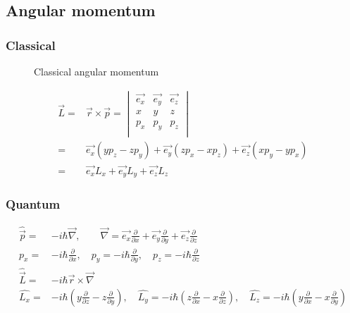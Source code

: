 	\subsection{Angular momentum}
		\label{sec:angmomentum}
		\subsubsection{Classical}
			\begin{figure}[!h]
				\centering
				
				\caption{Classical angular momentum}
				\label{clasmoment}
			\end{figure}
			
			\begin{align}
				\vec{L} =& \vec{r}\times\vec{p} =
				\begin{vmatrix}
					\vec{e_x} & \vec{e_y} & \vec{e_z} \\
					x & y & z \\
					p_x & p_y & p_z \\
				\end{vmatrix} \\
				=& \vec{e_x}(yp_z - zp_y) + \vec{e_y}(zp_x - xp_z) + \vec{e_z}(xp_y - yp_x) \\
				=& \vec{e_x}L_x + \vec{e_y}L_y + \vec{e_z}L_z
			\end{align}
			
		\subsubsection{Quantum}
			\begin{align}
				\hat{\vec{p}} =& -i\hbar\vec{\nabla}, \qquad \vec{\nabla} = \vec{e_x}\frac{\partial}{\partial x} + \vec{e_y}\frac{\partial}{\partial y} + \vec{e_z}\frac{\partial}{\partial z} \\
				p_x =& -i\hbar \frac{\partial}{\partial x}, \quad p_y = -i\hbar \frac{\partial}{\partial y}, \quad p_z = -i\hbar \frac{\partial}{\partial z} \\
				\hat{\vec{L}} =& -i\hbar\vec{r}\times\vec{\nabla} \\
				\hat{L_x} =& -i\hbar(y\frac{\partial}{\partial z} - z\frac{\partial}{\partial y}), \quad \hat{L_y} = -i\hbar(z\frac{\partial}{\partial x} - x\frac{\partial}{\partial z}), \quad \hat{L_z} = -i\hbar(y\frac{\partial}{\partial x} - x\frac{\partial}{\partial y}) 
			\end{align}
			

